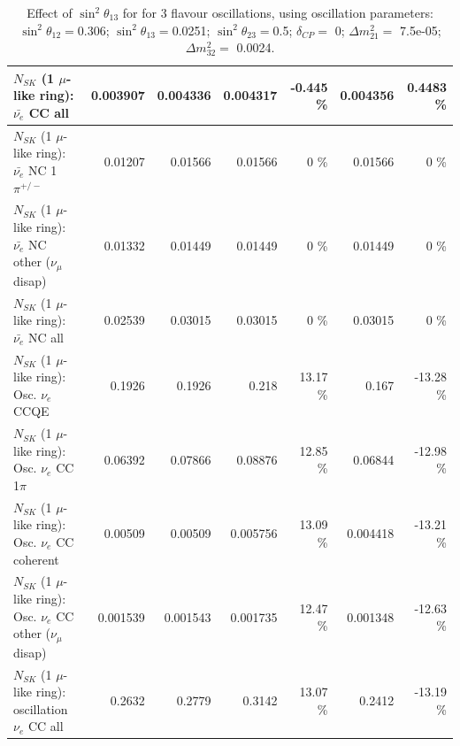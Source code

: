 \begin{table}
\begin{tabular}{| l | r | r | r  r | r  r |}
                            $N_{SK}$ (1 $\mu$-like ring): $\bar{\nu_{e}}$ CC all &        0.003907 &        0.004336 &        0.004317 &   -0.445 \%  &        0.004356 &   0.4483 \%  \\ 
\hline
                     $N_{SK}$ (1 $\mu$-like ring): $\bar{\nu_e}$ NC 1$\pi^{+/-}$ &         0.01207 &         0.01566 &         0.01566 &        0 \%  &         0.01566 &        0 \%  \\ 
          $N_{SK}$ (1 $\mu$-like ring): $\bar{\nu_e}$ NC other ($\nu_\mu$ disap) &         0.01332 &         0.01449 &         0.01449 &        0 \%  &         0.01449 &        0 \%  \\ 
                            $N_{SK}$ (1 $\mu$-like ring): $\bar{\nu_{e}}$ NC all &         0.02539 &         0.03015 &         0.03015 &        0 \%  &         0.03015 &        0 \%  \\ 
\hline
\hline
\hline
                                 $N_{SK}$ (1 $\mu$-like ring): Osc. $\nu_e$ CCQE &          0.1926 &          0.1926 &           0.218 &    13.17 \%  &           0.167 &   -13.28 \%  \\ 
                            $N_{SK}$ (1 $\mu$-like ring): Osc. $\nu_e$ CC 1$\pi$ &         0.06392 &         0.07866 &         0.08876 &    12.85 \%  &         0.06844 &   -12.98 \%  \\ 
                          $N_{SK}$ (1 $\mu$-like ring): Osc. $\nu_e$ CC coherent &         0.00509 &         0.00509 &        0.005756 &    13.09 \%  &        0.004418 &   -13.21 \%  \\ 
           $N_{SK}$ (1 $\mu$-like ring): Osc. $\nu_e$ CC other ($\nu_\mu$ disap) &        0.001539 &        0.001543 &        0.001735 &    12.47 \%  &        0.001348 &   -12.63 \%  \\ 
                        $N_{SK}$ (1 $\mu$-like ring): oscillation $\nu_e$ CC all &          0.2632 &          0.2779 &          0.3142 &    13.07 \%  &          0.2412 &   -13.19 \%  \\ 
\hline
\hline
\end{tabular}
\caption{ Effect of $\sin^2\theta_{13}$ for for 3 flavour oscillations, using oscillation parameters:  $\sin^2\theta_{12} = $0.306; $\sin^2\theta_{13} = $0.0251; $\sin^2\theta_{23} = $0.5; $\delta_{CP} = $        0; $\Delta m^2_{21} = $    7.5e-05; $\Delta m^2_{32} = $    0.0024. }
\label{tab:num_mixing13_1RmuT_3f_osc_t13:0.0251}
\end{table}
\clearpage
